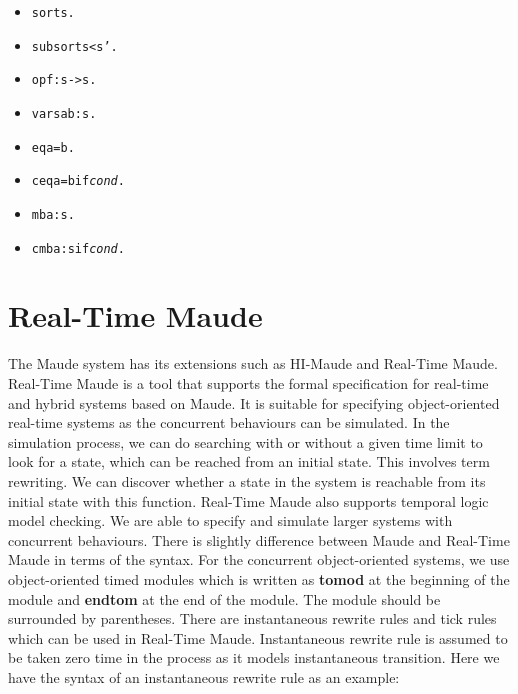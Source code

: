 \documentclass[a4paper,11pt]{report}
\begin{document}
\begin{itemize}
  \item \begin{alltt}sort s . \end{alltt}
  \item \begin{alltt}subsort s < s' . \end{alltt}
  \item \begin{alltt}op f : s -> s . \end{alltt}
	\item \begin{alltt}vars a b : s . \end{alltt}
	\item \begin{alltt}eq a = b . \end{alltt}
	\item \begin{alltt}ceq a = b if \textit{cond} . \end{alltt}
	\item \begin{alltt}mb a : s . \end{alltt}
	\item \begin{alltt}cmb a : s if \textit{cond} . \end{alltt}
\end{itemize}

\newpage
\section{Real-Time Maude}
The Maude system has its extensions such as HI-Maude and Real-Time Maude.
Real-Time Maude is a tool that supports the formal specification for real-time and hybrid systems based on Maude. It is suitable for specifying object-oriented real-time systems as the concurrent behaviours can be simulated. In the simulation process, we can do searching with or without a given time limit to look for a state, which can be reached from an initial state. This involves term rewriting. We can discover whether a state in the system is reachable from its initial state with this function. Real-Time Maude also supports temporal logic model checking. We are able to specify and simulate larger systems with concurrent behaviours. 
\newline There is slightly difference between Maude and Real-Time Maude in terms of the syntax. For the concurrent object-oriented systems, we use object-oriented timed modules which is written as \textbf{tomod} at the beginning of the module and \textbf{endtom} at the end of the module. The module should be surrounded by parentheses. There are instantaneous rewrite rules and tick rules which can be used in Real-Time Maude. Instantaneous rewrite rule is assumed to be taken zero time in the process as it models instantaneous transition. Here we have the syntax of an instantaneous rewrite rule as an example:
\end{document}
